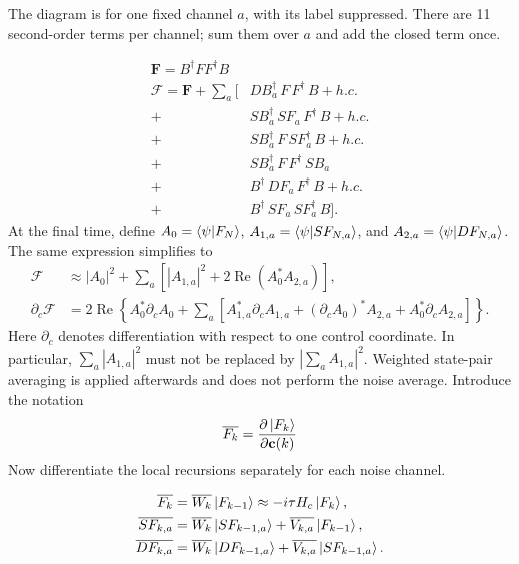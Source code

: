\documentclass{simple-notes}
\newcommand{\closef}{\mathbf{F}}
\newcommand{\dvbar}[1]{\overline{#1}}
\begin{document}
The diagram is for one fixed channel $a$, with its label suppressed. There are
11 second-order terms per channel; sum them over $a$ and add the closed term once.


\begin{align*}
    \closef = B^\dagger FF^\dagger B\\
    \mathcal{F} = \closef + \sum_a\Big[&DB_a^\dagger\, F\, F^\dagger\, B + h.c.\\
    + &SB_a^\dagger\, SF_a\, F^\dagger\, B + h.c.\\
    + &SB_a^\dagger\, F\, SF_a^\dagger\, B + h.c.\\
    + &SB_a^\dagger\, F\, F^\dagger\, SB_a \\
    + &B^\dagger\, DF_a\, F^\dagger\, B + h.c.\\
    + &B^\dagger\, SF_a\, SF_a^\dagger\, B\Big].
\end{align*}
At the final time, define $A_0=\braket{\psi}{F_N}$,
$A_{1,a}=\braket{\psi}{SF_{N,a}}$, and $A_{2,a}=\braket{\psi}{DF_{N,a}}$.
The same expression simplifies to
\begin{align}
\mathcal F &\approx |A_0|^2+\sum_a\left[|A_{1,a}|^2+
2\operatorname{Re}(A_0^* A_{2,a})\right],\\
\partial_c\mathcal F &=2\operatorname{Re}\left\{
A_0^*\partial_c A_0+\sum_a\left[
A_{1,a}^*\partial_c A_{1,a}+(\partial_c A_0)^*A_{2,a}
+A_0^*\partial_c A_{2,a}\right]\right\}.
\end{align}
Here $\partial_c$ denotes differentiation with respect to one control coordinate.
In particular, $\sum_a|A_{1,a}|^2$ must not be replaced by
$|\sum_a A_{1,a}|^2$. Weighted state-pair averaging is applied afterwards and
does not perform the noise average.
Introduce the notation
\begin{equation}
    \dvbar{F_k} = \pdv{\ket{F_k}}{\vb c(k)}
\end{equation}
Now differentiate the local recursions separately for each noise channel.

\begin{align*}
    \dvbar{F_k} &= \dvbar{W_k}\ket{F_{k-1}} \approx -i\tau H_c\ket{F_k},\\
    \dvbar{SF_{k,a}} &= \dvbar{W_k}\ket{SF_{k-1,a}} + \dvbar{V_{k,a}}\ket{F_{k-1}},\\
    \dvbar{DF_{k,a}} &= \dvbar{W_k}\ket{DF_{k-1,a}} + \dvbar{V_{k,a}}\ket{SF_{k-1,a}}.
\end{align*}
\end{document}
